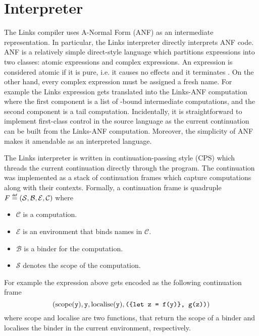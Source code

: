 \section{Interpreter}

The Links compiler uses A-Normal Form (ANF) as an intermediate representation. In particular, the Links interpreter directly interprets ANF code.
ANF is a relatively simple direct-style language which partitions expressions into two classes: atomic expressions and complex expressions. An expression is considered atomic if it is pure, i.e. it causes no effects and it terminates \cite{Flanagan1993}. On the other hand, every complex expression must be assigned a fresh name. For example the Links expression  gets translated into the Links-ANF computation  where the first component is a list of -bound intermediate computations, and the second component is a tail computation. Incidentally, it is straightforward to implement first-class control in the source language as the current continuation can be built from the Links-ANF computation. Moreover, the simplicity of ANF makes it amendable as an interpreted language.

The Links interpreter is written in continuation-passing style (CPS) which threads the current continuation directly through the program. The continuation was implemented as a stack of continuation frames which capture computations along with their contexts. Formally, a continuation frame is quadruple $F \defas (\mathcal{S},\mathcal{B},\mathcal{E},\mathcal{C})$ where
\begin{itemize}
  \item $\mathcal{C}$ is a computation.
  \item $\mathcal{E}$ is an environment that binds names in $\mathcal{C}$.
  \item $\mathcal{B}$ is a binder for the computation.
  \item $\mathcal{S}$ denotes the scope of the computation.
\end{itemize}
For example the expression above gets encoded as the following continuation frame
\[ \left( \text{scope}(\texttt{y}), \texttt{y}, \text{localise}(\texttt{y}), \texttt{(\{let z = f(y)\}, g(z))} \right) \]
where scope and localise are two functions, that return the scope of a binder and localises the binder in the current environment, respectively.

